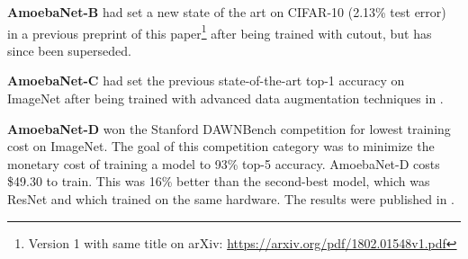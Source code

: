 \documentclass[letterpaper]{article} \usepackage{aaai19}  \usepackage{times}  \usepackage{helvet}  \usepackage{courier}  \usepackage{graphicx}  \frenchspacing
\begin{document}
\mbox{\textbf{AmoebaNet-B}} had set a new state of the art on CIFAR-10 (2.13\% test error) in a previous preprint of this paper\footnote{Version 1 with same title on arXiv: \url{https://arxiv.org/pdf/1802.01548v1.pdf}} after being trained with cutout, but has since been superseded.

\mbox{\textbf{AmoebaNet-C}} had set the previous state-of-the-art top-1 accuracy on ImageNet after being trained with advanced data augmentation techniques in \cite{cubuk2018autoaugment}.

\mbox{\textbf{AmoebaNet-D}} won the Stanford DAWNBench competition for lowest training cost on ImageNet. The goal of this competition category was to minimize the monetary cost of training a model to 93\% top-5 accuracy. \mbox{AmoebaNet-D} costs \$49.30 to train. This was 16\% better than the second-best model, which was ResNet and which trained on the same hardware. The results were published in \cite{coleman2018analysis}.
\end{document}
